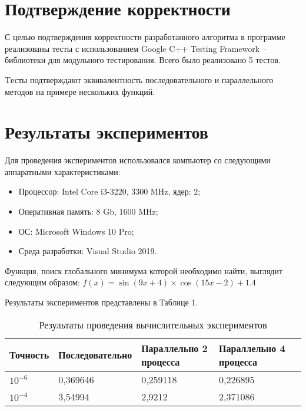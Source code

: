\documentclass{report}
\begin{document}
	\section*{Подтверждение корректности}
	С целью подтверждения корректности разработанного алгоритма в программе реализованы тесты с использованием Google C++ Testing Framework – библиотеки для модульного тестирования. Всего было реализовано 5 тестов. 
	\par Tесты подтверждают эквивалентность последовательного и параллельного методов на примере нескольких функций.
	\newpage
	
	\section*{Результаты экспериментов}
	Для проведения экспериментов использовался компьютер со следующими аппаратными характеристиками:
	\begin{itemize}
		\item Процессор: Intel Core i3-3220, 3300 MHz, ядер: 2;
		\item Оперативная память: 8 Gb, 1600 MHz;
		\item ОС: Microsoft Windows 10 Pro;
		\item Среда разработки: Visual Studio 2019.
	\end{itemize}
	
	\par Функция, поиск глобального минимума которой необходимо найти, выглядит следующим образом:
	$f(x) = \sin(9x + 4)\times{}\cos(15x -2) + 1.4 $
	\par Результаты экспериментов представлены в Таблице 1.
	
	\begin{table}[!h]
		\caption{Результаты проведения вычислительных экспериментов}
		\centering
		\begin{tabular}{|l|l|l|l|l|}
			\hline
			Точность & Последовательно & Параллельно 2 процесса & Параллельно 4 процесса  \\ \hline
			$10^{-6}$        & 0,369646        & 0,259118     & 0,226895      \\
			$10^{-4}$        & 3,54994         & 2,9212     & 2,371086       \\
			\hline
		\end{tabular}
	\end{table}
	
\end{document}
